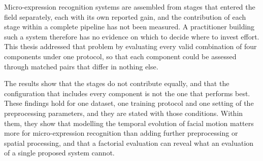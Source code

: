 Micro-expression recognition systems are assembled from stages that entered the field separately, each with its own reported gain, and the contribution of each stage within a complete pipeline has not been measured. A practitioner building such a system therefore has no evidence on which to decide where to invest effort. This thesis addressed that problem by evaluating every valid combination of four components under one protocol, so that each component could be assessed through matched pairs that differ in nothing else.

The results show that the stages do not contribute equally, and that the configuration that includes every component is not the one that performs best. These findings hold for one dataset, one training protocol and one setting of the preprocessing parameters, and they are stated with those conditions. Within them, they show that modelling the temporal evolution of facial motion matters more for micro-expression recognition than adding further preprocessing or spatial processing, and that a factorial evaluation can reveal what an evaluation of a single proposed system cannot.
